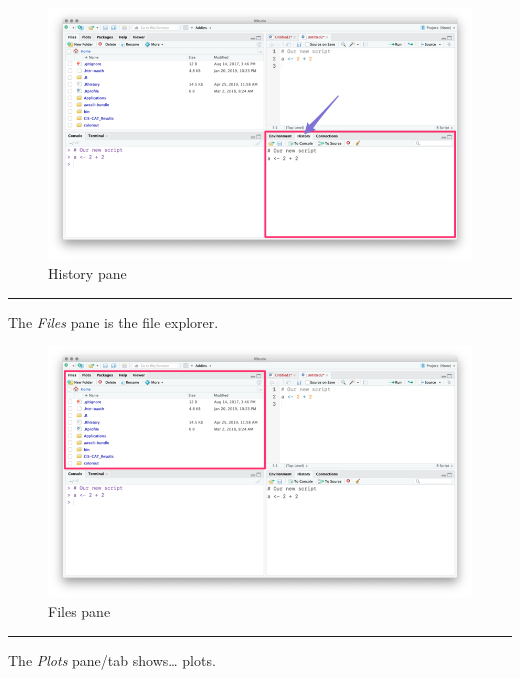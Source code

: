 \documentclass[]{book}
\begin{document}
\begin{figure}
\centering
\includegraphics{img/rstudio_history.png}
\caption{History pane}
\end{figure}

\begin{center}\rule{0.5\linewidth}{\linethickness}\end{center}

The \emph{Files} pane is the file explorer.

\begin{figure}
\centering
\includegraphics{img/rstudio_files.png}
\caption{Files pane}
\end{figure}

\begin{center}\rule{0.5\linewidth}{\linethickness}\end{center}

The \emph{Plots} pane/tab shows\ldots{} plots.
\end{document}
